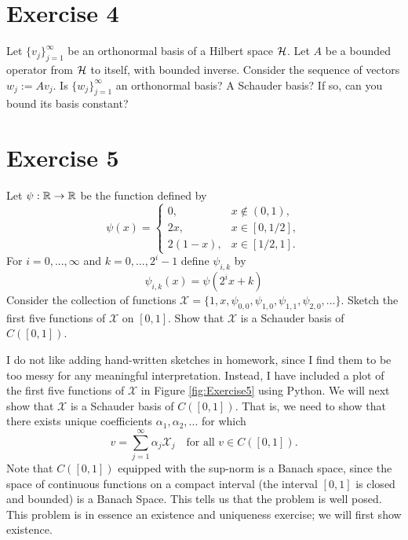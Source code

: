 \newpage
\section{Exercise 4}
Let $\{v_j\}_{j = 1}^\infty$ be an orthonormal basis of a Hilbert space $\mathcal{H}$. Let $A$ be a bounded operator from $\mathcal{H}$ to itself, with bounded inverse. Consider the sequence of vectors $w_j := Av_j$. Is $\{w_j\}_{j = 1}^\infty$ an orthonormal basis? A Schauder basis? If so, can you bound its basis constant?

\newcommand{\scX}{\mathcal{X}}

\newpage
\section{Exercise 5}
Let $\psi : \mathbb{R} \to \mathbb{R}$ be the function defined by 
\[\psi(x) = \begin{cases}
    0, &x \not \in (0, 1),\\
    2x, &x \in [0, 1/2],\\
    2(1 - x), &x \in [1/2, 1].
\end{cases}\]
For $i = 0, ..., \infty$ and $k = 0, ..., 2^i - 1$ define $\psi_{i, k}$ by 
\[\psi_{i, k}(x) = \psi(2^ix + k)\]
Consider the collection of functions $\scX = \{1, x, \psi_{0, 0}, \psi_{1, 0}, \psi_{1, 1}, \psi_{2, 0}, ...\}$. Sketch the first five functions of $\scX$ on $[0, 1]$. Show that $\scX$ is a Schauder basis of $C([0, 1])$. 
\partbreak
\begin{solution}

    I do not like adding hand-written sketches in homework, since I find them to be too messy for any meaningful interpretation. Instead, I have included a plot of the first five functions of $\scX$ in Figure \ref{fig:Exercise5} using Python. We will next show that $\scX$ is a Schauder basis of $C([0, 1])$. That is, we need to show that there exists unique coefficients $\alpha_1, \alpha_2, ...$ for which
    \[v = \sum_{j = 1}^\infty \alpha_j \scX_j \quad \text{for all } v \in C([0, 1]).\]
    Note that $C([0, 1])$ equipped with the sup-norm is a Banach space, since the space of continuous functions on a compact interval (the interval $[0, 1]$ is closed and bounded) is a Banach Space. This tells us that the problem is well posed. This problem is in essence an existence and uniqueness exercise; we will first show existence. 
\end{solution}

